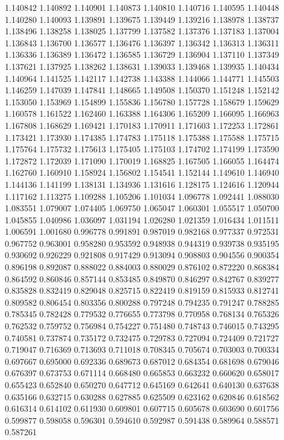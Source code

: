 1.140842
1.140892
1.140901
1.140873
1.140810
1.140716
1.140595
1.140448
1.140280
1.140093
1.139891
1.139675
1.139449
1.139216
1.138978
1.138737
1.138496
1.138258
1.138025
1.137799
1.137582
1.137376
1.137183
1.137004
1.136843
1.136700
1.136577
1.136476
1.136397
1.136342
1.136313
1.136311
1.136336
1.136389
1.136472
1.136585
1.136729
1.136904
1.137110
1.137349
1.137621
1.137925
1.138262
1.138631
1.139033
1.139468
1.139935
1.140434
1.140964
1.141525
1.142117
1.142738
1.143388
1.144066
1.144771
1.145503
1.146259
1.147039
1.147841
1.148665
1.149508
1.150370
1.151248
1.152142
1.153050
1.153969
1.154899
1.155836
1.156780
1.157728
1.158679
1.159629
1.160578
1.161522
1.162460
1.163388
1.164306
1.165209
1.166095
1.166963
1.167808
1.168629
1.169421
1.170183
1.170911
1.171603
1.172253
1.172861
1.173421
1.173930
1.174385
1.174783
1.175118
1.175388
1.175588
1.175715
1.175764
1.175732
1.175613
1.175405
1.175103
1.174702
1.174199
1.173590
1.172872
1.172039
1.171090
1.170019
1.168825
1.167505
1.166055
1.164474
1.162760
1.160910
1.158924
1.156802
1.154541
1.152144
1.149610
1.146940
1.144136
1.141199
1.138131
1.134936
1.131616
1.128175
1.124616
1.120944
1.117162
1.113275
1.109288
1.105206
1.101034
1.096778
1.092441
1.088030
1.083551
1.079007
1.074405
1.069750
1.065047
1.060301
1.055517
1.050700
1.045855
1.040986
1.036097
1.031194
1.026280
1.021359
1.016434
1.011511
1.006591
1.001680
0.996778
0.991891
0.987019
0.982168
0.977337
0.972531
0.967752
0.963001
0.958280
0.953592
0.948938
0.944319
0.939738
0.935195
0.930692
0.926229
0.921808
0.917429
0.913094
0.908803
0.904556
0.900354
0.896198
0.892087
0.888022
0.884003
0.880029
0.876102
0.872220
0.868384
0.864592
0.860846
0.857144
0.853485
0.849870
0.846297
0.842767
0.839277
0.835828
0.832419
0.829048
0.825715
0.822419
0.819159
0.815933
0.812741
0.809582
0.806454
0.803356
0.800288
0.797248
0.794235
0.791247
0.788285
0.785345
0.782428
0.779532
0.776655
0.773798
0.770958
0.768134
0.765326
0.762532
0.759752
0.756984
0.754227
0.751480
0.748743
0.746015
0.743295
0.740581
0.737874
0.735172
0.732475
0.729783
0.727094
0.724409
0.721727
0.719047
0.716369
0.713693
0.711018
0.708345
0.705674
0.703003
0.700334
0.697667
0.695000
0.692336
0.689673
0.687012
0.684354
0.681698
0.679046
0.676397
0.673753
0.671114
0.668480
0.665853
0.663232
0.660620
0.658017
0.655423
0.652840
0.650270
0.647712
0.645169
0.642641
0.640130
0.637638
0.635166
0.632715
0.630288
0.627885
0.625509
0.623162
0.620846
0.618562
0.616314
0.614102
0.611930
0.609801
0.607715
0.605678
0.603690
0.601756
0.599877
0.598058
0.596301
0.594610
0.592987
0.591438
0.589964
0.588571
0.587261

